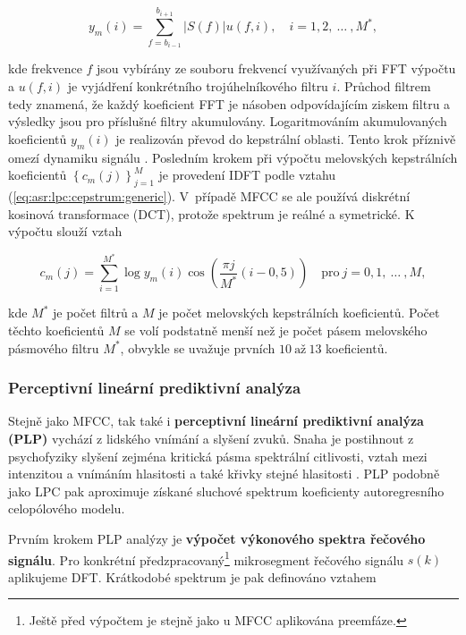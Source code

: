 \begin{equation}
  y_m(i) = \sum_{f=b_{i-1}}^{b_{i+1}} \left| S(f) \right| u\left(f, i\right),  \quad i = 1, 2,\ \dots\ ,M^{*},
  \label{eq:asr:mfcc:freq:responce}
\end{equation}

\noindent kde frekvence $f$ jsou vybírány ze souboru frekvencí využívaných při FFT výpočtu a $u(f, i)$ je vyjádření konkrétního trojúhelníkového filtru $i$. Průchod filtrem tedy znamená, že každý koeficient FFT je násoben odpovídajícím ziskem filtru a výsledky jsou pro příslušné filtry akumulovány. Logaritmováním akumulovaných koeficientů $y_{m}(i)$ je realizován převod do kepstrální oblasti. Tento krok příznivě omezí dynamiku signálu \cite{Benesty2007}. Posledním krokem při výpočtu melovských kepstrálních koeficientů $\left\{c_m\left(j\right)\right\}_{j=1}^{M}$ je provedení IDFT podle vztahu (\ref{eq:asr:lpc:cepstrum:generic}). V~případě MFCC se ale používá diskrétní kosinová transformace (DCT), protože spektrum je reálné a symetrické. K výpočtu slouží vztah

\begin{equation}
  c_{m}(j) = \sum_{i=1}^{M^{*}} \log y_m(i) \cos\left( \frac{\pi j}{M^{*}}\left(i - 0,5\right) \right) \quad \text{pro}\ j = 0, 1,\ \dots\ ,M,
  \label{eq:asr:mfcc:coef}
\end{equation}

\noindent kde $M^{*}$ je počet filtrů a $M$ je počet melovských kepstrálních koeficientů. Počet těchto koeficientů $M$ se volí podstatně menší než je počet pásem melovského pásmového filtru $M^{*}$, obvykle se uvažuje prvních $10\ \text{až}\ 13$ koeficientů.

\subsubsection{Perceptivní lineární prediktivní analýza}

Stejně jako MFCC, tak také i \textbf{perceptivní lineární prediktivní analýza (PLP)} vychází z lidského vnímání a slyšení zvuků. Snaha je postihnout z psychofyziky slyšení zejména kritická pásma spektrální citlivosti, vztah mezi intenzitou a vnímáním hlasitosti a také křivky stejné hlasitosti \cite{Psutka2006}. PLP podobně jako LPC pak aproximuje získané sluchové spektrum koeficienty autoregresního celopólového modelu.

Prvním krokem PLP analýzy je \textbf{výpočet výkonového spektra řečového signálu}. Pro konkrétní předzpracovaný\footnote{Ještě před výpočtem je stejně jako u MFCC aplikována preemfáze.} mikrosegment řečového signálu $s(k)$ aplikujeme DFT. Krátkodobé spektrum je pak definováno vztahem

